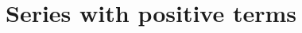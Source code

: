 \documentclass[../book/calcnotes.tex]{subfiles}
\begin{document}
\section{Series with positive terms}
\label{sec:series-positive-terms}

\begin{exercises}
\end{exercises}
\end{document}
